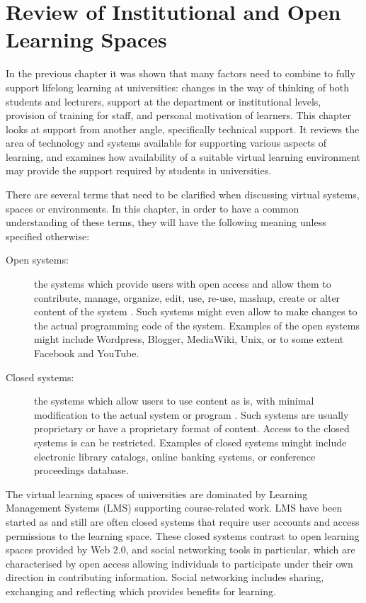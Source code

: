 \chapter{Review of Institutional and Open Learning Spaces \label{cha:systudy}}
In the previous chapter it was shown that many factors need to combine to fully
support lifelong learning at universities: changes in the way of thinking of
both students and lecturers, support at the department or institutional levels,
provision of training for staff, and personal motivation of learners. This
chapter looks at \LLLs support from another angle, specifically technical
support. It reviews the area of technology and systems available for supporting
various aspects of learning, and examines how availability of a suitable virtual
learning environment may provide the \LLLs support required by students in
universities.

There are several terms that need to be clarified when discussing virtual
systems, spaces or environments. In this chapter, in order to have a common
understanding of these terms, they will have the following meaning unless
specified otherwise:

\begin{description}
	\item[Open systems:] the systems which provide users with open access and allow
	them to contribute, manage, organize, edit, use, re-use, mashup, create or
	alter content of the system \citep{Fay2009}. Such systems might even allow to
	make changes to the actual programming code of the system. Examples of the open
	systems might include Wordpress, Blogger, MediaWiki, Unix, or to some extent
	Facebook and YouTube.
	\item[Closed systems:] the systems which allow users to use content as is, with
	minimal modification to the actual system or program \citep{Fay2009}. Such
	systems are usually proprietary or have a proprietary format of content. Access
	to the closed systems is can be restricted. Examples of closed systems
	minght include electronic library catalogs, online banking systems, or
	conference proceedings database.
\end{description}

The virtual learning spaces of universities are dominated by Learning Management
Systems (LMS) supporting course-related work. LMS have been started as and
still are often closed systems that require user accounts and access permissions
to the learning space. These closed systems contrast to open learning spaces
provided by Web 2.0, and social networking tools in particular, which are
characterised by open access allowing individuals to participate under their own
direction in contributing information. Social networking includes sharing,
exchanging and reflecting which provides benefits for learning. 
 
